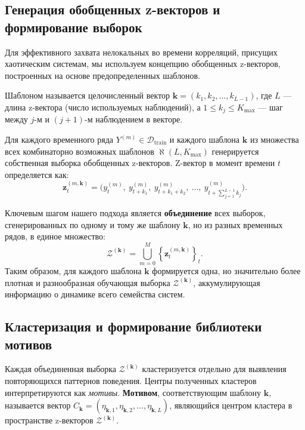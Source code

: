 \subsection{Генерация обобщенных z-векторов и формирование выборок}

Для эффективного захвата нелокальных во времени корреляций, присущих хаотическим системам,
 мы используем концепцию обобщенных z-векторов, построенных на основе предопределенных шаблонов.

Шаблоном называется целочисленный вектор $\boldsymbol{k} = (k_1, k_2, \dots, k_{L-1})$,
 где $L$ — длина z-вектора (число используемых наблюдений), а $1 \le k_j \le K_{\max}$ — шаг между $j$-м и $(j+1)$-м наблюдением в векторе.

Для каждого временного ряда $Y^{(m)} \in \mathcal{D}_{\text{train}}$ и каждого шаблона
 $\boldsymbol{k}$ из множества всех комбинаторно возможных шаблонов $\aleph(L, K_{\max})$
  генерируется собственная выборка обобщенных z-векторов. Z-вектор в момент времени $t$ определяется как:
\[
\mathbf{z}_{t}^{(m, \boldsymbol{k})} = \bigl(y^{(m)}_t,\ y^{(m)}_{t+k_1},\ y^{(m)}_{t+k_1+k_2},\ \dots,\ y^{(m)}_{t + \sum_{j=1}^{L-1} k_j}\bigr).
\]


Ключевым шагом нашего подхода является \textbf{объединение} всех выборок, сгенерированных
 по одному и тому же шаблону $\boldsymbol{k}$, но из разных временных рядов, в единое множество:
\[
\mathcal{Z}^{(\boldsymbol{k})} = \bigcup_{m=0}^{M} \left\{ \mathbf{z}_{t}^{(m, \boldsymbol{k})} \right\}_{t}.
\]
Таким образом, для каждого шаблона $\boldsymbol{k}$ формируется одна, но значительно
 более плотная и разнообразная обучающая выборка $\mathcal{Z}^{(\boldsymbol{k})}$,
  аккумулирующая информацию о динамике всего семейства систем.

\subsection{Кластеризация и формирование библиотеки мотивов}

Каждая объединенная выборка $\mathcal{Z}^{(\boldsymbol{k})}$ кластеризуется отдельно
 для выявления повторяющихся паттернов поведения. Центры полученных кластеров
  интерпретируются как \textit{мотивы}.
\textbf{Мотивом}, соответствующим шаблону $\boldsymbol{k}$,
 называется вектор $C_{\boldsymbol{k}} = (\eta_{\boldsymbol{k},1},
 \eta_{\boldsymbol{k},2}, \dots, \eta_{\boldsymbol{k},L})$, являющийся
 центром кластера в пространстве z-векторов $\mathcal{Z}^{(\boldsymbol{k})}$.

